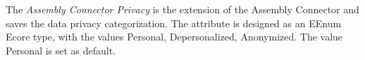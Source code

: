 The \textit{Assembly Connector Privacy} is the extension of the Assembly Connector and saves the data privacy categorization. The attribute is designed as an EEnum Ecore type, with the values Personal, Depersonalized, Anonymized. The value Personal is set as default.






